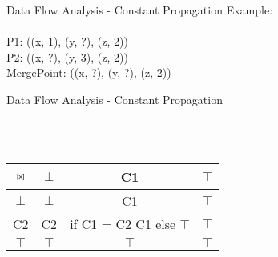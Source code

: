 \documentclass[mcgill,slideColor,colorBG,pdf]{prosper}
\begin{document}
\begin{slide} {Data Flow Analysis - Constant Propagation}
Example: \\
\ \\
P1: ((x, 1), (y, ?), (z, 2))\\
P2: ((x, ?), (y, 3), (z, 2))\\
MergePoint: ((x, ?), (y, ?), (z, 2))\\

\end{slide}

\begin{slide} {Data Flow Analysis - Constant Propagation}
\begin{center}\end{center}
\ \\
\ \\
\begin{center}
\begin{tabular}[t]{c|c|c|c} 
$\bowtie$ & $\bot$ & C1 & $\top$ \\ \hline
$\bot$ & $\bot$ & C1 & $\top$ \\ \hline
C2 & C2 & if C1 = C2 C1 else $\top$ & $\top$ \\ \hline
$\top$ & $\top$ & $\top$ & $\top$ 
\end{tabular}
\end{center}
\end{slide}
\end{document}
